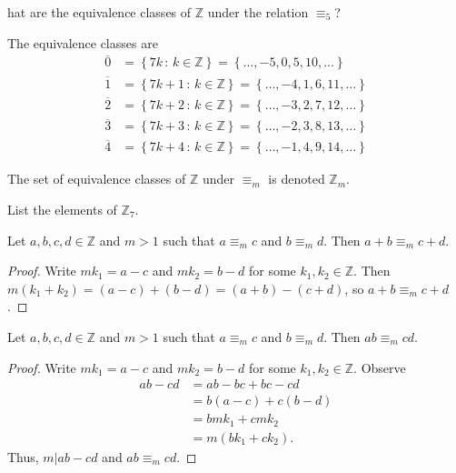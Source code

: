 \documentclass[english,course]{lecture}
\theoremstyle{plain}
\newenvironment{question}[1]
  {\renewcommand\theinnerquestion{#1}\innerquestion}
  {\endinnerquestion}
\def\set#1{\left\{ {#1} \right\}}
\def\setof#1#2{{\left\{#1\,\colon\,#2\right\}}}
\def\Z{{\mathbb Z}}
\def\presnotes{}
\begin{document}
\presnotes

\begin{question}
	What are the equivalence classes of $\Z$ under the relation $\equiv_5$?
\end{question}

\begin{answer}
	The equivalence classes are
	\begin{align*}
		\overline{0} &= \setof{7k}{k\in\Z} = \set{\ldots, -5, 0, 5, 10, \ldots}\\
		\overline{1} &= \setof{7k+1}{k\in\Z} = \set{\ldots, -4, 1, 6, 11, \ldots}\\
		\overline{2} &= \setof{7k+2}{k\in\Z} = \set{\ldots, -3, 2, 7, 12, \ldots}\\
		\overline{3} &= \setof{7k+3}{k\in\Z} = \set{\ldots, -2, 3, 8, 13, \ldots}\\
		\overline{4} &= \setof{7k+4}{k\in\Z} = \set{\ldots, -1, 4, 9, 14, \ldots}
	\end{align*}
\end{answer}

\presnotes

\begin{notation}
	The set of equivalence classes of $\Z$ under $\equiv_m$ is denoted $\Z_m$.
\end{notation}

\begin{exer}
	List the elements of $\Z_7$.
\end{exer}

\presnotes

\begin{theorem}
	Let $a,b, c,d\in \Z$ and $m > 1$ such that $a\equiv_m c$ and $b\equiv_m d$.
	Then $a+b \equiv_m c + d$.
\end{theorem}

\begin{proof}
	Write $mk_1 = a-c$ and $m k_2 = b-d$ for some $k_1,k_2\in \Z$.
	Then $m(k_1 + k_2) = (a-c) + (b-d) = (a+b) - (c+d)$, so $a+b \equiv_m c+d$.
\end{proof}

\presnotes

\begin{theorem}
	Let $a,b, c,d\in \Z$ and $m > 1$ such that $a\equiv_m c$ and $b\equiv_m d$.
	Then $ab \equiv_m c  d$.
\end{theorem}

\begin{proof}
	Write $mk_1 = a-c$ and $m k_2 = b-d$ for some $k_1,k_2\in \Z$.
	Observe
	\begin{align*}
		ab -cd &= ab - bc + bc - cd \\
		&= b(a-c) + c(b-d)\\
		&= bmk_1 + cmk_2\\
		&= m(bk_1 + ck_2).
	\end{align*}
	Thus, $m|ab-cd$ and $ab \equiv_m cd$.
\end{proof}
\end{document}
